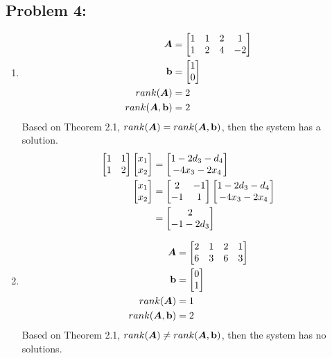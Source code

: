 \documentclass{article}
\begin{document}
\subsection*{{Problem 4: }}
\label{}
\begin{enumerate} 
\item 
\begin{align*} 
\mA &= \bmat{1 & 1 & 2 & 1 \\ 1 & 2 & 4 & -2 }  \\ 
\vb &= \bmat{1 \\ 0 }  \\
rank(\mA) &= 2 \\
rank(\mA, \vb) &= 2 \\
\end{align*} 
Based on Theorem 2.1, $rank(\mA) = rank(\mA,\vb) $, then the system has a solution. 
\begin{align*}
\bmat{1 & 1\\ 1 & 2} \bmat{x_1 \\ x_2} &= \bmat{1-2d_3-d_4 \\ -4x_3-2x_4}  \\
\bmat{x_1\\ x_2} &= \bmat{2 & -1 \\ -1 & 1} \bmat{1-2d_3-d_4 \\ -4x_3-2x_4} \\
& = \bmat{2 \\ -1-2d_3}
\end{align*}


\item 
\begin{align*}
\mA& =\bmat{2 & 1 & 2 & 1\\ 6 & 3 & 6 & 3} \\
\vb &= \bmat{0 \\ 1 } \\
rank(\mA) &= 1\\
rank(\mA, \vb)& = 2
\end{align*} 
Based on Theorem 2.1, $rank(\mA) \neq rank(\mA, \vb)$, then the system has no solutions. 
\end{enumerate}



\hypertarget{}{}
\end{document}
